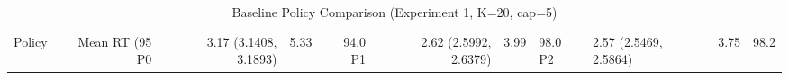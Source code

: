 \begin{table}[htbp]
\centering
\caption{Baseline Policy Comparison (Experiment 1, K=20, cap=5)}
\label{tab:baseline}
\begin{tabular}{lrrrrrr}
\toprule
Policy & Mean RT (95%
\midrule
P0 & 3.17 (3.1408, 3.1893) & 5.33 & 94.0%
P1 & 2.62 (2.5992, 2.6379) & 3.99 & 98.0%
P2 & 2.57 (2.5469, 2.5864) & 3.75 & 98.2%
\bottomrule
\end{tabular}
\end{table}